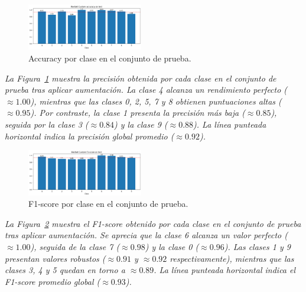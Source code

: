 \documentclass[conference]{IEEEtran}
\begin{document}
\begin{figure}[H]
    \centering
    \includegraphics[width=0.45\textwidth]{graphics-resnet-raw/resnet_raw_with_class_accuracy.png}
    \caption{Accuracy por clase en el conjunto de prueba.}
    \label{fig:resnet_raw_with_class_accuracy}
\end{figure}
\noindent\textit{%
La Figura~\ref{fig:resnet_raw_with_class_accuracy} muestra la precisión obtenida por cada clase en el conjunto de prueba tras aplicar aumentación. La clase 4 alcanza un rendimiento perfecto (\(\approx1.00\)), mientras que las clases 0, 2, 5, 7 y 8 obtienen puntuaciones altas (\(\approx0.95\)). Por contraste, la clase 1 presenta la precisión más baja (\(\approx0.85\)), seguida por la clase 3 (\(\approx0.84\)) y la clase 9 (\(\approx0.88\)). La línea punteada horizontal indica la precisión global promedio (\(\approx0.92\)). 
}

\begin{figure}[H]
    \centering
    \includegraphics[width=0.45\textwidth]{graphics-resnet-raw/resnet_raw_with_class_f1.png}
    \caption{F1-score por clase en el conjunto de prueba.}
    \label{fig:resnet_raw_with_class_f1}
\end{figure}
\noindent\textit{%
La Figura~\ref{fig:resnet_raw_with_class_f1} muestra el F1-score obtenido por cada clase en el conjunto de prueba tras aplicar aumentación. Se aprecia que la clase 6 alcanza un valor perfecto (\(\approx1.00\)), seguida de la clase 7 (\(\approx0.98\)) y la clase 0 (\(\approx0.96\)). Las clases 1 y 9 presentan valores robustos (\(\approx0.91\) y \(\approx0.92\) respectivamente), mientras que las clases 3, 4 y 5 quedan en torno a \(\approx0.89\). La línea punteada horizontal indica el F1-score promedio global (\(\approx0.93\)).
}
\end{document}
